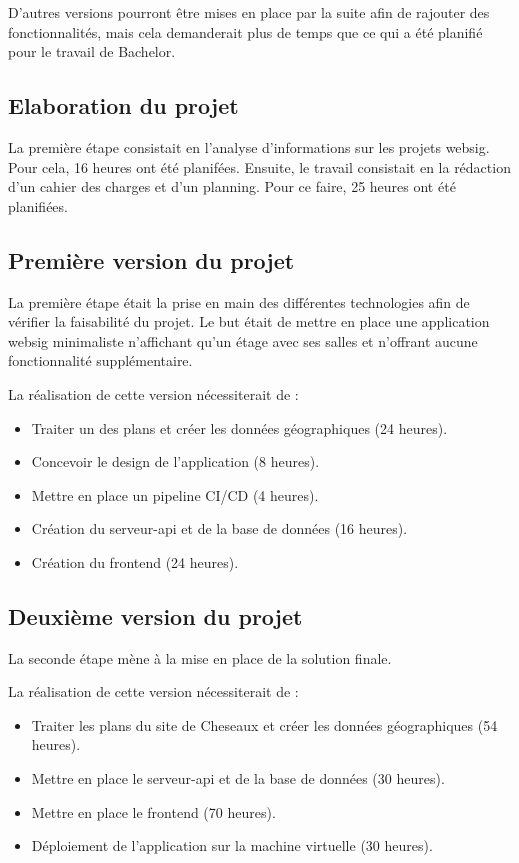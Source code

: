 \documentclass[
    iai, %
    il, %
]{heig-tb}
\begin{document}
D'autres versions pourront être mises en place par la suite afin de rajouter des fonctionnalités,
mais cela demanderait plus de temps que ce qui a été planifié pour le travail de Bachelor.

\subsection{Elaboration du projet}
La première étape consistait en l'analyse d'informations sur les projets \gls{websig}. Pour cela, 16 heures ont été planifées.
Ensuite, le travail consistait en la rédaction d'un cahier des charges et d'un planning. Pour ce faire, 25 heures ont été planifiées.

\subsection{Première version du projet}
La première étape était la prise en main des différentes technologies afin de vérifier la faisabilité du projet.
Le but était de mettre en place une application  \gls{websig} minimaliste n'affichant qu'un étage avec ses salles et n'offrant aucune fonctionnalité supplémentaire.

La réalisation de cette version nécessiterait de :

\begin{itemize}
    \item Traiter un des plans et créer les données géographiques (24 heures).
    \item Concevoir le design de l'application (8 heures).
    \item Mettre en place un pipeline CI/CD (4 heures).
    \item Création du serveur-api et de la base de données (16 heures).
    \item Création du frontend (24 heures).
\end{itemize}

\subsection{Deuxième version du projet}
La seconde étape mène à la mise en place de la solution finale.

La réalisation de cette version nécessiterait de :

\begin{itemize}
    \item Traiter les plans du site de Cheseaux et créer les données géographiques (54 heures).
    \item Mettre en place le serveur-api et de la base de données (30 heures).
    \item Mettre en place le frontend (70 heures).
    \item Déploiement de l'application sur la machine virtuelle (30 heures).
\end{itemize}
\end{document}
